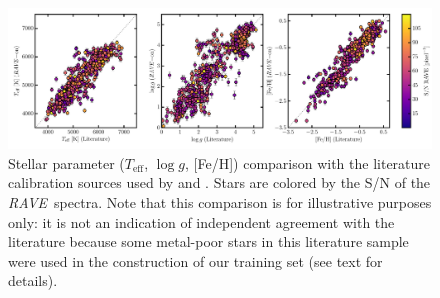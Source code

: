 \documentclass[preprint]{aastex61}
\newcommand{\acronym}[1]{{\small{#1}}}
\newcommand{\project}[1]{\textsl{#1}}
\newcommand{\rave}{\project{\acronym{RAVE}}}
\newcommand{\teff}{T_{\mathrm{eff}}}
\newcommand{\logg}{\log g}
\begin{document}
\begin{figure}[p]
\includegraphics[width=\textwidth]{figures/kordopatis-calibration.pdf}
\caption{Stellar parameter ($\teff$, $\logg$, [Fe/H]) comparison with the literature calibration sources used by \citet{Kordopatis_2013} and \citet{Kunder_2016}. Stars are colored by the S/N of the \rave\ spectra. Note that this comparison is for illustrative purposes only: it is not an indication of independent agreement with the literature because some metal-poor stars in this literature sample were used in the construction of our training set (see text for details).\label{fig:kordopatis-calibration}}
\end{figure}
\end{document}
